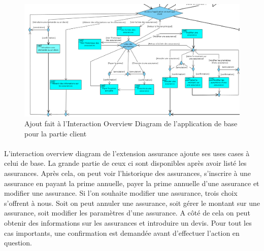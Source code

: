 \begin{figure}[ht]
    \centering
    \includegraphics[scale=0.22]{img/InteractionDiagramClient.png}
    \caption{Ajout fait à l'Interaction Overview Diagram de l'application de base pour la partie client}
    \label{fig1}
    \end{figure}

\paragraph{}L’interaction overview diagram de l’extension assurance ajoute ses uses cases à celui de base. La grande partie de ceux ci sont disponibles après avoir listé les assurances. Après cela, on peut voir l’historique des assurances, s’inscrire à une assurance en payant la prime annuelle, payer la prime annuelle d’une assurance et modifier une assurance. Si l’on souhaite modifier une assurance, trois choix s’offrent à nous. Soit on peut annuler une assurance, soit gérer le montant sur une assurance, soit modifier les paramètres d’une assurance. A côté de cela on peut obtenir des informations sur les assurances et introduire un devis. Pour tout les cas importants, une confirmation est demandée avant d’effectuer l’action en question.
